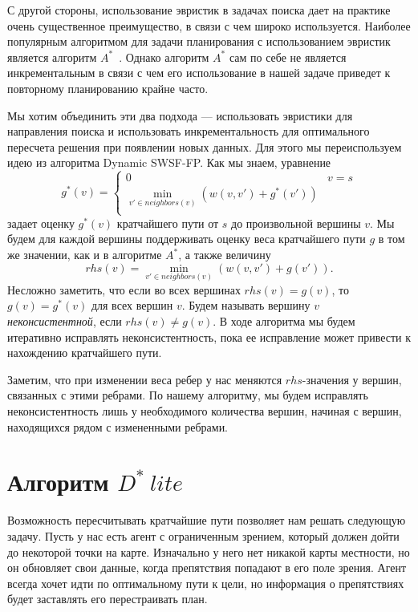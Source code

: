 \documentclass[11pt]{article}
\newcommand{\dstarlite}{\(D^*\ lite\)\,}
\begin{document}
    С другой стороны, использование эвристик в задачах поиска дает на практике очень существенное преимущество, в связи с чем широко используется.
    Наиболее популярным алгоритмом для задачи планирования с использованием эвристик является алгоритм $A^*$~\cite{Nilsson1971ProblemsolvingMI}.
    Однако алгоритм $A^*$ сам по себе не является инкрементальным в связи с чем его использование в нашей задаче приведет к повторному планированию крайне часто.

    Мы хотим объединить эти два подхода --- использовать эвристики для направления поиска и использовать инкрементальность для оптимального пересчета решения при появлении новых данных.
    Для этого мы переиспользуем идею из алгоритма Dynamic SWSF-FP.
    Как мы знаем, уравнение \[ g^*(v) = \begin{cases}
                                            0 &  v = s\\
                                            \min_{v' \in neighbors(v)} (w(v, v') + g^*(v')) \\
    \end{cases} \]
    задает оценку $g^*(v)$ кратчайшего пути от $s$ до произвольной вершины $v$.
    Мы будем для каждой вершины поддерживать оценку веса кратчайшего пути $g$ в том же значении, как и в алгоритме $A^*$, а также
    величину \[rhs(v) = \min_{v' \in neighbors(v)} (w(v, v') + g(v')). \]
    Несложно заметить, что если во всех вершинах $rhs(v) = g(v)$, то $g(v) = g^*(v)$ для всех вершин $v$.
    Будем называть вершину $v$ \textit{неконсистентной}, если $rhs(v) \neq g(v)$.
    В ходе алгоритма мы будем итеративно исправлять неконсистентность, пока ее исправление может привести к нахождению кратчайшего пути.

    Заметим, что при изменении веса ребер у нас меняются $rhs$-значения у вершин, связанных с этими ребрами.
    По нашему алгоритму, мы будем исправлять неконсистентность лишь у необходимого количества вершин, начиная с вершин, находящихся рядом с измененными ребрами.


    \section{Алгоритм \dstarlite}
    Возможность пересчитывать кратчайшие пути позволяет нам решать следующую задачу.
    Пусть у нас есть агент с ограниченным зрением, который должен дойти до некоторой точки на карте.
    Изначально у него нет никакой карты местности, но он обновляет свои данные, когда препятствия попадают в его поле зрения.
    Агент всегда хочет идти по оптимальному пути к цели, но информация о препятствиях будет заставлять его перестраивать план.
\end{document}
